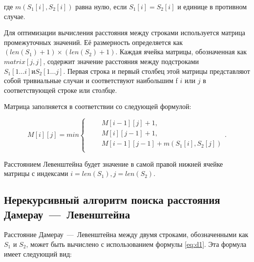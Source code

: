 где $m(S_{1}[i], S_{2}[i])$ равна нулю, если $S_{1}[i] = S_{2}[i]$ и единице в противном случае.

Для оптимизации вычисления расстояния между строками используется матрица промежуточных значений. Её размерность определяется как $(len(S_{1}) + 1) × (len(S_{2}) + 1)$.
Каждая ячейка матрицы, обозначенная как $matrix[j, j]$, содержит значение расстояния между подстроками $S_{1}[1...i] и S_{2}[1...j]$. 
Первая строка и первый столбец этой матрицы представляют собой тривиальные случаи и соответствуют наибольшим f $i$ или $j$ в соответствующей строке или столбце.

Матрица заполняется в соответствии со следующей формулой:

\begin{equation}
	\label{eq:mat}
	M[i][j] = min \begin{cases}
		\qquad M[i-1][j] + 1,\\
		\qquad M[i][j-1] + 1,\\
		\qquad M[i-1][j-1] + m(S_{1}[i], S_{2}[j])\\
	\end{cases}.
\end{equation}

Расстоянием Левенштейна будет значение в самой правой нижней ячейке матрицы с индексами $i = len(S_{1}), j = len(S_{2})$.

\subsection{Нерекурсивный алгоритм поиска расстояния Дамерау~---~Левенштейна}

Расстояние Дамерау~---~Левенштейна между двумя строками, обозначенными как $S_1$ и $S_2$, может быть вычислено с использованием формулы \ref{eq:d1}. 
Эта формула имеет следующий вид:

